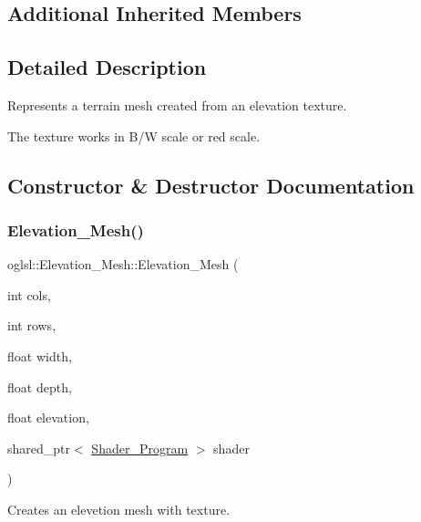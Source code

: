 \subsection*{Additional Inherited Members}


\subsection{Detailed Description}
Represents a terrain mesh created from an elevation texture. 

The texture works in B/W scale or red scale. 

\subsection{Constructor \& Destructor Documentation}
\mbox{\label{classoglsl_1_1_elevation___mesh_ab23733c3bcec54943bb012c272a44ca3}} 
\subsubsection{\texorpdfstring{Elevation\+\_\+\+Mesh()}{Elevation\_Mesh()}}
{\footnotesize\ttfamily oglsl\+::\+Elevation\+\_\+\+Mesh\+::\+Elevation\+\_\+\+Mesh (\begin{DoxyParamCaption}\item[{int}]{cols,  }\item[{int}]{rows,  }\item[{float}]{width,  }\item[{float}]{depth,  }\item[{float}]{elevation,  }\item[{shared\+\_\+ptr$<$ \mbox{\hyperlink{classoglsl_1_1_shader___program}{Shader\+\_\+\+Program}} $>$}]{shader }\end{DoxyParamCaption})}



Creates an elevetion mesh with texture. 

\mbox{\label{classoglsl_1_1_elevation___mesh_afc3f5227d96a854e9e66723fbf728cb2}} 
